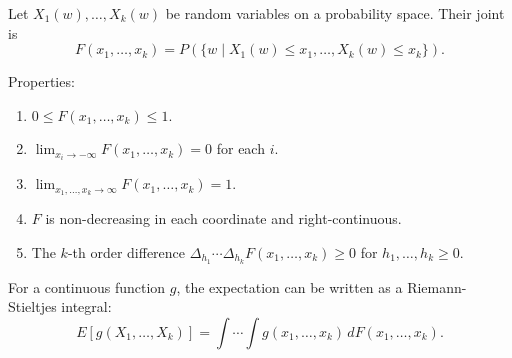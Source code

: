 Let $X_1(w), \ldots, X_k(w)$ be random variables on a probability space. Their joint  is
$$F(x_1, \ldots, x_k) = P(\{w \mid X_1(w) \leq x_1, \ldots, X_k(w) \leq x_k\}).$$

Properties:
\begin{enumerate}
\item $0 \leq F(x_1, \ldots, x_k) \leq 1$.
\item $\lim_{x_i \to -\infty} F(x_1, \ldots, x_k) = 0$ for each $i$.
\item $\lim_{x_1, \ldots, x_k \to \infty} F(x_1, \ldots, x_k) = 1$.
\item $F$ is non-decreasing in each coordinate and right-continuous.
\item The $k$-th order difference $\Delta_{h_1} \cdots \Delta_{h_k} F(x_1, \ldots, x_k) \geq 0$ for $h_1, \ldots, h_k \geq 0$.
\end{enumerate}

For a continuous function $g$, the expectation can be written as a Riemann-Stieltjes integral:
$$E[g(X_1, \ldots, X_k)] = \int \cdots \int g(x_1, \ldots, x_k) \, dF(x_1, \ldots, x_k).$$
